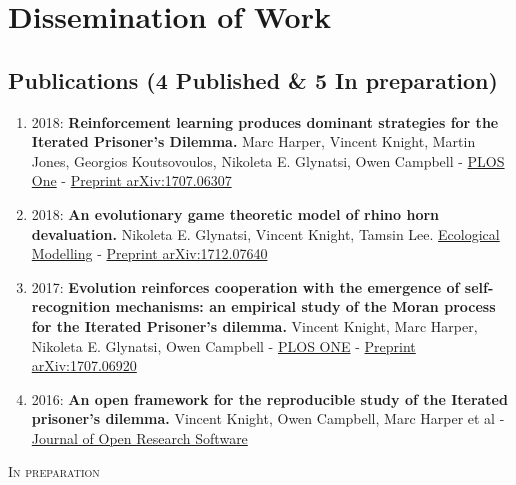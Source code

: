 \chapter{Dissemination of Work}

\section*{Publications (4 Published \& 5 In preparation)}
\begin{enumerate}
\def\labelenumi{\arabic{enumi}.}
\item
2018: \textbf{Reinforcement learning produces dominant strategies for
the Iterated Prisoner's Dilemma.} Marc Harper, Vincent Knight, Martin
Jones, Georgios Koutsovoulos, Nikoleta E. Glynatsi, Owen Campbell -
\href{https://journals.plos.org/plosone/article?id=10.1371/journal.pone.0188046}{PLOS
One} -
\href{https://arxiv.org/abs/1707.06307}{Preprint arXiv:1707.06307}
\item
2018: \textbf{An evolutionary game theoretic model of rhino horn
devaluation.} Nikoleta E. Glynatsi, Vincent Knight, Tamsin Lee.
\href{https://www.sciencedirect.com/science/article/pii/S0304380018303260}{Ecological
Modelling} -
\href{https://arxiv.org/abs/1712.07640}{Preprint arXiv:1712.07640}
\item
2017: \textbf{Evolution reinforces cooperation with the emergence of
self-recognition mechanisms: an empirical study of the Moran process
for the Iterated Prisoner's dilemma.} Vincent Knight, Marc Harper,
Nikoleta E. Glynatsi, Owen Campbell -
\href{https://journals.plos.org/plosone/article/comments?id=10.1371/journal.pone.0204981}{PLOS
ONE} -
\href{https://arxiv.org/abs/1707.06920}{Preprint arXiv:1707.06920}
\item
2016: \textbf{An open framework for the reproducible study of the
Iterated prisoner's dilemma.} Vincent Knight, Owen Campbell, Marc
Harper et al -
\href{https://openresearchsoftware.metajnl.com/articles/10.5334/jors.125/}{Journal
of Open Research Software}
\end{enumerate}

\textsc{In preparation}

